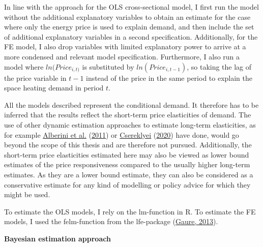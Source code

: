 \documentclass[12pt,twoside]{reedthesis}
\begin{document}
In line with the approach for the OLS cross-sectional model, I first run the model without the additional explanatory variables to obtain an estimate for the case where only the energy price is used to explain demand, and then include the set of additional explanatory variables in a second specification. Additionally, for the FE model, I also drop variables with limited explanatory power to arrive at a more condensed and relevant model specification. Furthermore, I also run a model where \(ln(Price_{i,t)}\) is substituted by \(ln(Price_{i,t-1})\), so taking the lag of the price variable in \(t-1\) instead of the price in the same period to explain the space heating demand in period \(t\).

All the models described represent the conditional demand. It therefore has to be inferred that the results reflect the short-term price elasticities of demand. The use of other dynamic estimation approaches to estimate long-term elasticities, as for example \protect\hyperlink{ref-alberini_etal11}{Alberini et al.} (\protect\hyperlink{ref-alberini_etal11}{2011}) or \protect\hyperlink{ref-csereklyei20}{Csereklyei} (\protect\hyperlink{ref-csereklyei20}{2020}) have done, would go beyond the scope of this thesis and are therefore not pursued. Additionally, the short-term price elasticities estimated here may also be viewed as lower bound estimates of the price responsiveness compared to the usually higher long-term estimates. As they are a lower bound estimate, they can also be considered as a conservative estimate for any kind of modelling or policy advice for which they might be used.

To estimate the OLS models, I rely on the lm-function in R. To estimate the FE models, I used the felm-function from the lfe-package (\protect\hyperlink{ref-gaure2013lfe}{Gaure, 2013}).

\textbf{Bayesian estimation approach}
\end{document}
